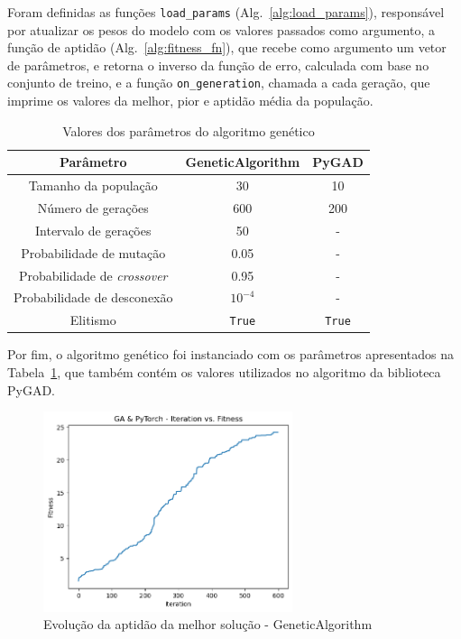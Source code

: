 Foram definidas as funções \texttt{load\_params} (Alg.~\ref{alg:load_params}), responsável por atualizar os pesos do modelo com os valores passados como argumento, a função de aptidão (Alg.~\ref{alg:fitness_fn}), que recebe como argumento um vetor de parâmetros, e retorna o inverso da função de erro, calculada com base no conjunto de treino, e a função \texttt{on\_generation}, chamada a cada geração, que imprime os valores da melhor, pior e aptidão média da população.

\begin{table}[htbp]
    \centering
    \begin{tabular}{ccc}
        \hline
        \textbf{Parâmetro}                  & \textbf{GeneticAlgorithm} & \textbf{PyGAD} \\
        \hline
        Tamanho da população                & 30                        & 10             \\
        Número de gerações                  & 600                       & 200            \\
        Intervalo de gerações               & 50                        & -              \\
        Probabilidade de mutação            & 0.05                      & -              \\
        Probabilidade de \textit{crossover} & 0.95                      & -              \\
        Probabilidade de desconexão         & $10^{-4}$                 & -              \\
        Elitismo                            & \texttt{True}             & \texttt{True}  \\
        \hline
    \end{tabular}
    \caption{Valores dos parâmetros do algoritmo genético}
    \label{tab:ga_param_values}
\end{table}

Por fim, o algoritmo genético foi instanciado com os parâmetros apresentados na Tabela~\ref{tab:ga_param_values}, que também contém os valores utilizados no algoritmo da biblioteca PyGAD\@.

\begin{figure}[htbp]
    \centering
    \includegraphics[width=0.65\textwidth]{images/ga_fitness}
    \caption{Evolução da aptidão da melhor solução - GeneticAlgorithm}
    \label{fig:ga_fitness}
\end{figure}

